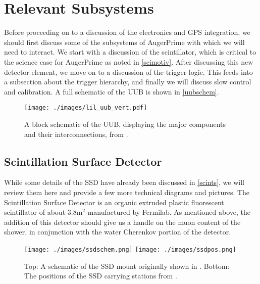 \section{Relevant Subsystems}
\label{subsystems}
Before proceeding on to a discussion of the electronics and GPS integration, we should first discuss some of the subsystems of AugerPrime with which we will need to interact. We start with a discussion of the scintillator, which is critical to the science case for AugerPrime as noted in \autoref{scimotiv}. After discussing this new detector element, we move on to a discussion of the trigger logic. This feeds into a subsection about the trigger hierarchy, and finally we will discuss slow control and calibration. A full schematic of the UUB is shown in \autoref{uubschem}.
\begin{figure}[hp]
\centering
\texttt{[image: ./images/lil\_uub\_vert.pdf]}
\caption[UUB Block Schematic]{A block schematic of the UUB, displaying the major components and their interconnections, from \textcite{tiina}.}
\label{uubschem}
\end{figure}

\newpage
\subsection{Scintillation Surface Detector}
\label{ssd}
While some details of the SSD have already been discussed in \autoref{scints}, we will review them here and provide a few more technical diagrams and pictures. The Scintillation Surface Detector is an organic extruded plastic fluorescent scintillator of about 3.8m$^2$ manufactured by Fermilab. As mentioned above, the addition of this detector should give us a handle on the muon content of the shower, in conjunction with the water Cherenkov portion of the detector. 

\begin{figure}[h!]
\begin{center}
\texttt{[image: ./images/ssdschem.png]}
\texttt{[image: ./images/ssdpos.png]}
\caption[AugerPrime SSD Station Positions]{Top: A schematic of the SSD mount originally shown in \textcite{augerscint}. Bottom: The positions of the SSD carrying stations from \textcite{firstdat}.}
\label{scintdiag2}
\end{center}
\end{figure}

